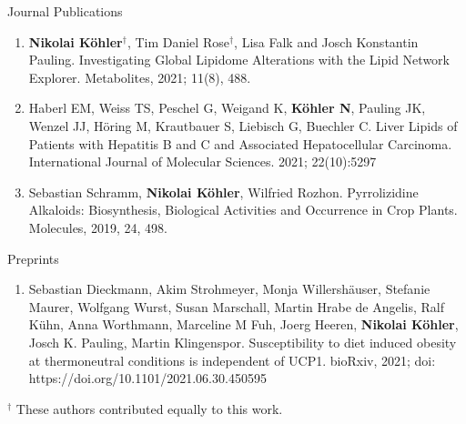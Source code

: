 
\datedsubsection{}
{%
}
{%
	Journal Publications
}
{%
	\begin{enumerate}
		\item \textbf{Nikolai K\"ohler}$^{\dagger}$, Tim Daniel Rose$^{\dagger}$, Lisa Falk and Josch Konstantin Pauling. Investigating Global Lipidome Alterations with the Lipid Network Explorer. Metabolites, 2021; 11(8), 488.
		\item Haberl EM, Weiss TS, Peschel G, Weigand K, \textbf{K\"ohler N}, Pauling JK, Wenzel JJ, Höring M, Krautbauer S, Liebisch G, Buechler C. Liver Lipids of Patients with Hepatitis B and C and Associated Hepatocellular Carcinoma. International Journal of Molecular Sciences. 2021; 22(10):5297
		\item Sebastian Schramm, \textbf{Nikolai K\"ohler}, Wilfried Rozhon. Pyrrolizidine Alkaloids: Biosynthesis, Biological Activities and Occurrence in Crop Plants. Molecules, 2019, 24, 498.
		\setcounter{publicationCounter}{\value{enumi}}	%
	\end{enumerate}
}

\datedsubsection{}
{%
}
{%
	Preprints
}
{%
	\begin{enumerate}
		\item Sebastian Dieckmann, Akim Strohmeyer, Monja Willershäuser, Stefanie Maurer, Wolfgang Wurst, Susan Marschall, Martin Hrabe de Angelis, Ralf Kühn, Anna Worthmann, Marceline M Fuh, Joerg Heeren, \textbf{Nikolai Köhler}, Josch K. Pauling, Martin Klingenspor. Susceptibility to diet induced obesity at thermoneutral conditions is independent of UCP1. bioRxiv, 2021; doi: https://doi.org/10.1101/2021.06.30.450595
		\setcounter{publicationCounter}{\value{enumi}}	%
	\end{enumerate}
}
\bigskip
{\footnotesize $^{\dagger}$ These authors contributed equally to this work.}


